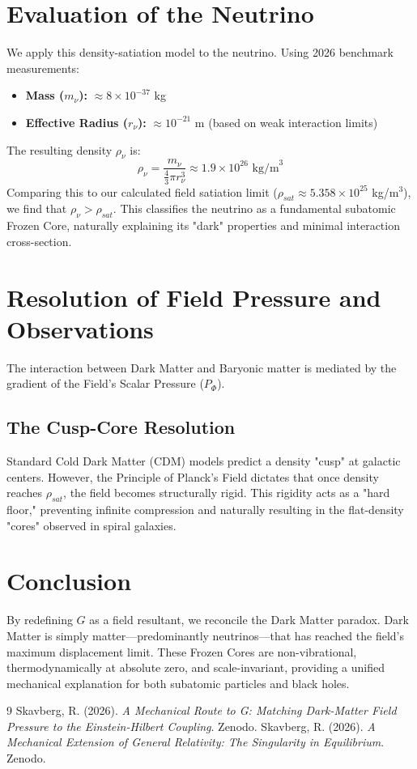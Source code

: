 \documentclass[12pt,a4paper]{article}
\begin{document}
\section{Evaluation of the Neutrino}
We apply this density-satiation model to the neutrino. Using 2026 benchmark measurements:
\begin{itemize}
    \item \textbf{Mass ($m_\nu$):} $\approx 8 \times 10^{-37}$ kg
    \item \textbf{Effective Radius ($r_\nu$):} $\approx 10^{-21}$ m (based on weak interaction limits)
\end{itemize}
The resulting density $\rho_\nu$ is:
\begin{equation}
\rho_\nu = \frac{m_\nu}{\frac{4}{3}\pi r_\nu^3} \approx 1.9 \times 10^{26} \text{ kg/m}^3
\end{equation}
Comparing this to our calculated field satiation limit ($\rho_{sat} \approx 5.358 \times 10^{25}$ kg/m$^3$), we find that $\rho_\nu > \rho_{sat}$. This classifies the neutrino as a fundamental subatomic Frozen Core, naturally explaining its "dark" properties and minimal interaction cross-section.

\section{Resolution of Field Pressure and Observations}
The interaction between Dark Matter and Baryonic matter is mediated by the gradient of the Field's Scalar Pressure ($P_\Phi$).

\subsection{The Cusp-Core Resolution}
Standard Cold Dark Matter (CDM) models predict a density "cusp" at galactic centers. However, the Principle of Planck’s Field dictates that once density reaches $\rho_{sat}$, the field becomes structurally rigid. This rigidity acts as a "hard floor," preventing infinite compression and naturally resulting in the flat-density "cores" observed in spiral galaxies.

\section{Conclusion}
By redefining $G$ as a field resultant, we reconcile the Dark Matter paradox. Dark Matter is simply matter—predominantly neutrinos—that has reached the field's maximum displacement limit. These Frozen Cores are non-vibrational, thermodynamically at absolute zero, and scale-invariant, providing a unified mechanical explanation for both subatomic particles and black holes.

\begin{thebibliography}{9}
 Skavberg, R. (2026). \textit{A Mechanical Route to G: Matching Dark-Matter Field Pressure to the Einstein-Hilbert Coupling}. Zenodo.
 Skavberg, R. (2026). \textit{A Mechanical Extension of General Relativity: The Singularity in Equilibrium}. Zenodo.
\end{thebibliography}
\end{document}
